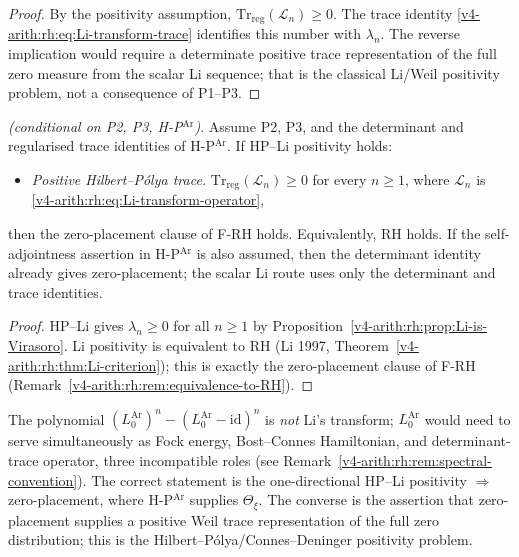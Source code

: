 \begin{proof}
By the positivity assumption,
\(\mathrm{Tr}_{\mathrm{reg}}(\mathcal L_{n})\geq0\). The trace
identity \eqref{v4-arith:rh:eq:Li-transform-trace} identifies this
number with \(\lambda_{n}\). The reverse implication would require a
determinate positive trace representation of the full zero measure
from the scalar Li sequence; that is the classical Li/Weil positivity
problem, not a consequence of P1--P3.
\end{proof}

\begin{theorem}
\label{v4-arith:rh:thm:VB-implies-F-RH}
\ClaimStatusProvedHere \emph{(conditional on P2, P3, H-P\(^{\mathrm{Ar}}\))}.
Assume P2, P3, and the determinant and regularised trace identities
of H-P\(^{\mathrm{Ar}}\). If HP--Li positivity holds:
\begin{itemize}
\item[\textbf{(HP--Li)}] \emph{Positive Hilbert--P\'olya trace.}
\(\mathrm{Tr}_{\mathrm{reg}}(\mathcal L_{n})\geq0\) for every
\(n\geq1\), where \(\mathcal L_{n}\) is
\eqref{v4-arith:rh:eq:Li-transform-operator},
\end{itemize}
then the zero-placement clause of F-RH holds. Equivalently, RH holds.
If the self-adjointness assertion in H-P\(^{\mathrm{Ar}}\) is also
assumed, then the determinant identity already gives zero-placement;
the scalar Li route uses only the determinant and trace identities.
\end{theorem}

\begin{proof}
HP--Li gives \(\lambda_{n}\geq0\) for all \(n\geq1\) by
Proposition~\ref{v4-arith:rh:prop:Li-is-Virasoro}. Li positivity is equivalent
to RH (Li 1997,
Theorem~\ref{v4-arith:rh:thm:Li-criterion}); this is exactly the
zero-placement clause of F-RH
(Remark~\ref{v4-arith:rh:rem:equivalence-to-RH}).
\end{proof}

\begin{remark}
\label{v4-arith:rh:rem:one-directional}
The polynomial \((L_{0}^{\mathrm{Ar}})^{n}-(L_{0}^{\mathrm{Ar}}-\mathrm{id})^{n}\)
is \emph{not} Li's transform; \(L_{0}^{\mathrm{Ar}}\) would need to
serve simultaneously as Fock energy, Bost--Connes Hamiltonian, and
determinant-trace operator, three incompatible roles (see
Remark~\ref{v4-arith:rh:rem:spectral-convention}). The correct statement
is the one-directional HP--Li positivity
\(\Rightarrow\) zero-placement, where H-P\(^{\mathrm{Ar}}\) supplies
\(\Theta_{\xi}\). The converse is the assertion that zero-placement
supplies a positive Weil trace representation of the full zero
distribution; this is the Hilbert--P\'olya/Connes--Deninger
positivity problem.
\end{remark}

